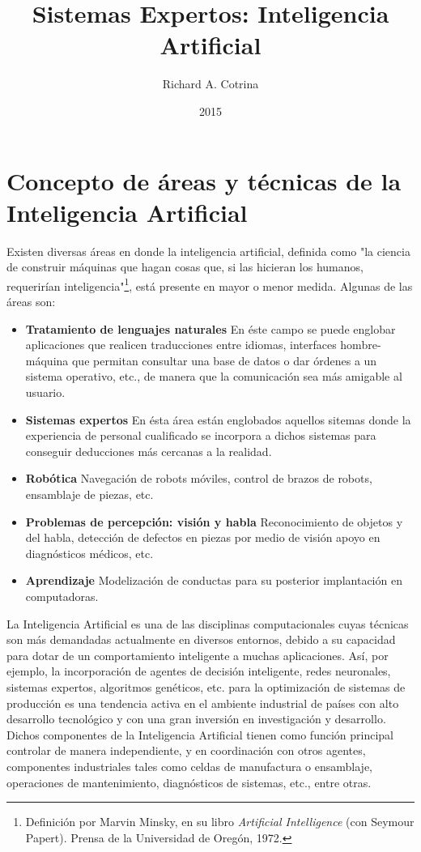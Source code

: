\documentclass[a4paper,11pt, spanish]{report}
\title{\Huge \textbf{Sistemas Expertos: Inteligencia Artificial}}
\author{Richard A. Cotrina}
\date{2015}
\begin{document}
\maketitle

\section*{Concepto de áreas y técnicas de la Inteligencia Artificial}
Existen diversas áreas en donde la inteligencia artificial, definida como "la ciencia de construir máquinas que hagan cosas que, si las hicieran los humanos, requerirían inteligencia"\footnote{Definición por Marvin Minsky, en su libro \textit{Artificial Intelligence} (con Seymour Papert). Prensa de la Universidad de Oregón, 1972.}, está presente en mayor o menor medida. Algunas de las áreas son:
\begin{itemize}
  \item \textbf{Tratamiento de lenguajes naturales} En éste campo se puede englobar aplicaciones que realicen traducciones entre idiomas, interfaces hombre-máquina que permitan consultar una base de datos o dar órdenes a un sistema operativo, etc., de manera que la comunicación sea más amigable al usuario.
  \item \textbf{Sistemas expertos} En ésta área están englobados aquellos sitemas donde la experiencia de personal cualificado se incorpora a dichos sistemas para conseguir deducciones más cercanas a la realidad.
  \item \textbf{Robótica} Navegación de robots móviles, control de brazos de robots, ensamblaje de piezas, etc.
  \item \textbf{Problemas de percepción: visión y habla} Reconocimiento de objetos y del habla, detección de defectos en piezas por medio de visión apoyo en diagnósticos médicos, etc.
  \item \textbf{Aprendizaje} Modelización de conductas para su posterior implantación en computadoras.
\end{itemize}
La Inteligencia Artificial es una de las disciplinas computacionales cuyas técnicas son más demandadas actualmente en diversos entornos, debido a su capacidad para dotar de un comportamiento inteligente a muchas aplicaciones. Así, por ejemplo, la incorporación de agentes de decisión inteligente, redes neuronales, sistemas expertos, algoritmos genéticos, etc. para la optimización de sistemas de producción es una tendencia activa en el ambiente industrial de países con alto desarrollo tecnológico y con una gran inversión en investigación y desarrollo. Dichos componentes de la Inteligencia Artificial tienen como función principal controlar de manera independiente, y en coordinación con otros agentes, componentes industriales tales como celdas de manufactura o ensamblaje, operaciones de mantenimiento, diagnósticos de sistemas, etc., entre otras.
\end{document}
